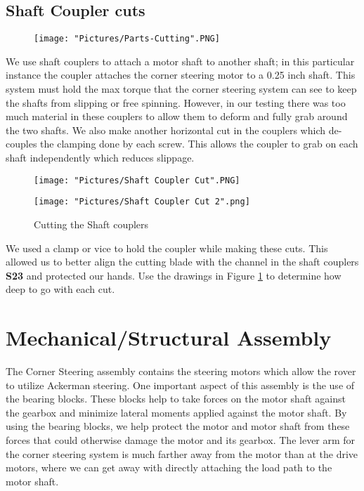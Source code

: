 \documentclass[12pt]{article}
\begin{document}
\subsection{Shaft Coupler cuts}

\begin{figure}[H]
	\centering
	\texttt{[image: "Pictures/Parts-Cutting".PNG]}
\end{figure}

We use shaft couplers to attach a motor shaft to another shaft; in this particular instance the coupler attaches the corner steering motor to a 0.25 inch shaft. This system must hold the max torque that the corner steering system can see to keep the shafts from slipping or free spinning. However, in our testing there was too much material in these couplers to allow them to deform and fully grab around the two shafts. We also make another horizontal cut in the couplers which de-couples the clamping done by each screw. This allows the coupler to grab on each shaft independently which reduces slippage. 


\begin{figure}[H]
  	\centering
  	\begin{minipage}[b]{0.35\textwidth}
   		 \texttt{[image: "Pictures/Shaft Coupler Cut".PNG]}		
	\end{minipage}
 	 \hfill
 	 \begin{minipage}[b]{0.55\textwidth}
  		  \texttt{[image: "Pictures/Shaft Coupler Cut 2".png]}
  	\end{minipage}
 	 \caption{Cutting the Shaft couplers}
	\label{Shaft coupler cut}
\end{figure}

We used a clamp or vice to hold the coupler while making these cuts.  This allowed us to better align the cutting blade with the channel in the shaft couplers \textbf{S23} and protected our hands. Use the drawings in Figure \ref{Shaft coupler cut} to determine how deep to go with each cut.


\section{Mechanical/Structural Assembly} 
The Corner Steering assembly contains the steering motors which allow the rover to utilize Ackerman steering. One important aspect of this assembly is the use of the bearing blocks. These blocks help to take forces on the motor shaft against the gearbox and minimize lateral moments applied against the motor shaft. By using the bearing blocks, we help protect the motor and motor shaft from these forces that could otherwise damage the motor and its gearbox. The lever arm for the corner steering system is much farther away from the motor than at the drive motors, where we can get away with directly attaching the load path to the motor shaft.
\end{document}
